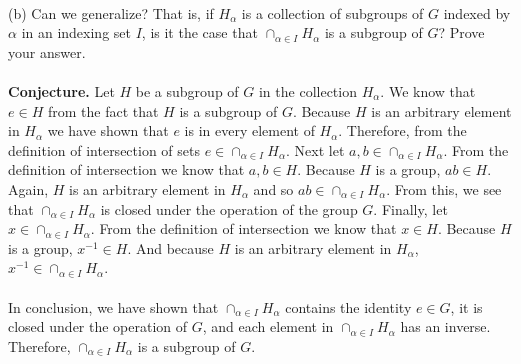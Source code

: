 \documentclass[11pt,a4paper]{article}
\begin{document}
~\\
(b) Can we generalize? That is, if ${H_\alpha}$ is a collection of subgroups of $G$ indexed by $\alpha$ in an indexing set $I$, is it the case that $\cap_{\alpha\in I} H_\alpha$ is a subgroup of $G$? Prove your answer.\\
~\\
{\bf Conjecture.} Let $H$ be a subgroup of $G$ in the collection $H_\alpha$. We know that $e\in H$ from the fact that $H$ is a subgroup of $G$. Because $H$ is an arbitrary element in $H_\alpha$ we have shown that $e$ is in every element of $H_\alpha$. Therefore, from the definition of intersection of sets $e\in\cap_{\alpha\in I} H_\alpha$. Next let $a,b\in\cap_{\alpha\in I} H_\alpha$. From the definition of intersection we know that $a,b\in H$. Because $H$ is a group, $ab\in H$. Again, $H$ is an arbitrary element in $H_\alpha$ and so $ab\in\cap_{\alpha\in I} H_\alpha$. From this, we see that $\cap_{\alpha\in I} H_\alpha$ is closed under the operation of the group $G$. Finally, let $x\in \cap_{\alpha\in I} H_\alpha$. From the definition of intersection we know that $x\in H$. Because $H$ is a group, $x^{-1}\in H$. And because $H$ is an arbitrary element in $H_\alpha$, $x^{-1}\in\cap_{\alpha\in I} H_\alpha$.\\
~\\
In conclusion, we have shown that $\cap_{\alpha\in I} H_\alpha$ contains the identity $e\in G$, it is closed under the operation of $G$, and each element in $\cap_{\alpha\in I} H_\alpha$ has an inverse. Therefore, $\cap_{\alpha\in I} H_\alpha$ is a subgroup of $G$.
\end{document}
